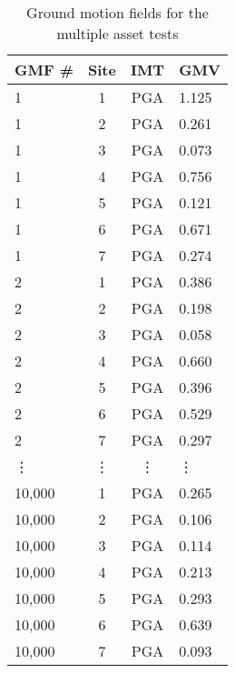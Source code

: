 \begin{table}[htbp]

\centering
\begin{tabular}{ l c c l }

\hline
\rowcolor{anti-flashwhite}
\bf{GMF #} & \bf{Site} & \bf{IMT} & \bf{GMV}\\
\hline
1 & 1 & PGA &  1.125 \\
1 & 2 & PGA &  0.261 \\
1 & 3 & PGA &  0.073 \\
1 & 4 & PGA &  0.756 \\
1 & 5 & PGA &  0.121 \\
1 & 6 & PGA &  0.671 \\
1 & 7 & PGA &  0.274 \\
\hline
2 & 1 & PGA &  0.386 \\
2 & 2 & PGA &  0.198 \\
2 & 3 & PGA &  0.058 \\
2 & 4 & PGA &  0.660 \\
2 & 5 & PGA &  0.396 \\
2 & 6 & PGA &  0.529 \\
2 & 7 & PGA &  0.297 \\
\hline
\vdots & \vdots & \vdots & \vdots \\
\hline
10,000 & 1 & PGA & 0.265 \\
10,000 & 2 & PGA & 0.106 \\
10,000 & 3 & PGA & 0.114 \\
10,000 & 4 & PGA & 0.213 \\
10,000 & 5 & PGA & 0.293 \\
10,000 & 6 & PGA & 0.639 \\
10,000 & 7 & PGA & 0.093 \\
\hline
\end{tabular}

\caption{Ground motion fields for the multiple asset tests}
\label{tab:scenario-gmfs-multiple}
\end{table}